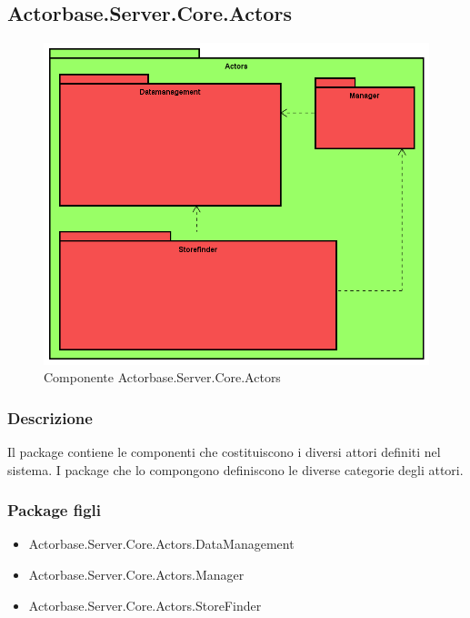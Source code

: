 \documentclass[a4paper]{article}
\begin{document}
		\subsection{Actorbase.Server.Core.Actors}
			\begin{figure} [H]
			\centering
			\includegraphics[scale=0.50]{Server/Package/ActorsLevel.png}
			\caption{Componente Actorbase.Server.Core.Actors}
			\end{figure}
			\subsubsection{Descrizione}
				Il package contiene le componenti che costituiscono i diversi attori definiti nel sistema. I package che lo compongono definiscono le diverse categorie degli attori.
			\subsubsection{Package figli}
			\begin{itemize}
				\item Actorbase.Server.Core.Actors.DataManagement
				\item Actorbase.Server.Core.Actors.Manager
				\item Actorbase.Server.Core.Actors.StoreFinder
			\end{itemize}
			
\end{document}
